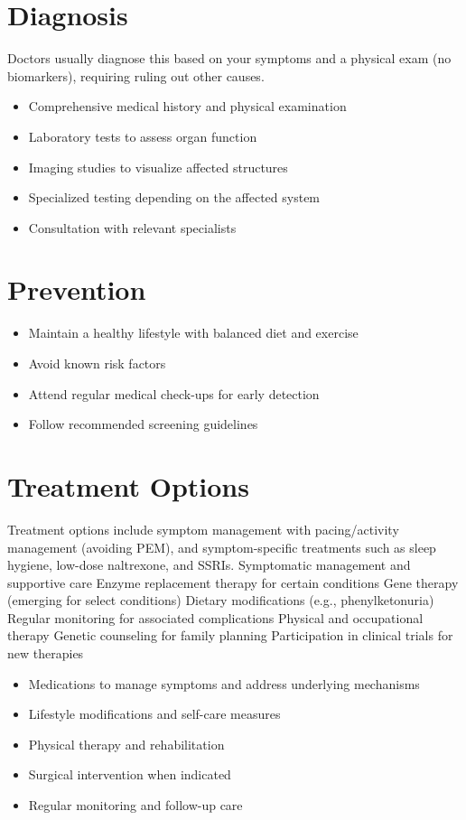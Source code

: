 \section{Diagnosis}
Doctors usually diagnose this based on your symptoms and a physical exam (no biomarkers), requiring ruling out other causes.

\begin{itemize}[noitemsep]
  \item Comprehensive medical history and physical examination
  \item Laboratory tests to assess organ function
  \item Imaging studies to visualize affected structures
  \item Specialized testing depending on the affected system
  \item Consultation with relevant specialists
\end{itemize}
\section{Prevention}
\begin{itemize}[noitemsep]
  \item Maintain a healthy lifestyle with balanced diet and exercise
  \item Avoid known risk factors
  \item Attend regular medical check-ups for early detection
  \item Follow recommended screening guidelines
\end{itemize}
\section{Treatment Options}
Treatment options include symptom management with pacing/activity management (avoiding PEM), and symptom-specific treatments such as sleep hygiene, low-dose naltrexone, and SSRIs. Symptomatic management and supportive care Enzyme replacement therapy for certain conditions Gene therapy (emerging for select conditions) Dietary modifications (e.g., phenylketonuria) Regular monitoring for associated complications Physical and occupational therapy Genetic counseling for family planning Participation in clinical trials for new therapies

\begin{itemize}[noitemsep]
  \item Medications to manage symptoms and address underlying mechanisms
  \item Lifestyle modifications and self-care measures
  \item Physical therapy and rehabilitation
  \item Surgical intervention when indicated
  \item Regular monitoring and follow-up care
\end{itemize}
